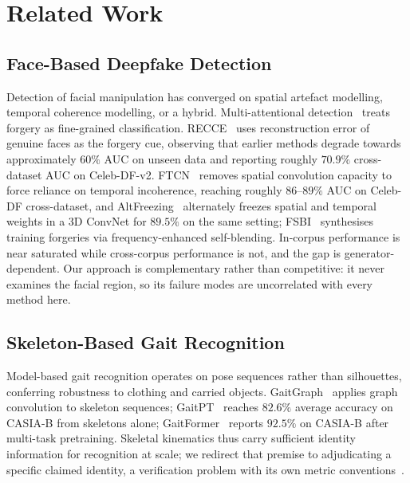 \documentclass[conference]{IEEEtran}
\begin{document}
\section{Related Work}
\label{sec:related}

\subsection{Face-Based Deepfake Detection}

Detection of facial manipulation has converged on spatial artefact modelling,
temporal coherence modelling, or a hybrid. Multi-attentional
detection~\cite{multi_attn} treats forgery as fine-grained classification. RECCE~\cite{recce} uses reconstruction error of genuine faces
as the forgery cue, observing that earlier methods degrade towards
approximately $60\%$ AUC on unseen data and reporting roughly $70.9\%$
cross-dataset AUC on Celeb-DF-v2. FTCN~\cite{ftcn} removes spatial convolution
capacity to force reliance on temporal incoherence, reaching roughly
$86$--$89\%$ AUC on Celeb-DF cross-dataset, and
AltFreezing~\cite{altfreezing} alternately freezes spatial and temporal weights
in a 3D ConvNet for $89.5\%$ on the same setting; FSBI~\cite{fsbi} synthesises
training forgeries via frequency-enhanced self-blending. In-corpus performance
is near saturated while cross-corpus performance is not, and the gap is
generator-dependent. Our approach is complementary rather than competitive: it
never examines the facial region, so its failure modes are uncorrelated with
every method here.

\subsection{Skeleton-Based Gait Recognition}

Model-based gait recognition operates on pose sequences rather than
silhouettes, conferring robustness to clothing and carried objects.
GaitGraph~\cite{gaitgraph} applies graph convolution to skeleton sequences;
GaitPT~\cite{gaitpt} reaches $82.6\%$ average accuracy on CASIA-B from
skeletons alone; GaitFormer~\cite{gaitformer} reports $92.5\%$ on CASIA-B after
multi-task pretraining. Skeletal kinematics thus carry sufficient identity
information for recognition at scale; we redirect that premise to adjudicating a
specific claimed identity, a verification problem with its own metric
conventions~\cite{iso19795}.
\end{document}
